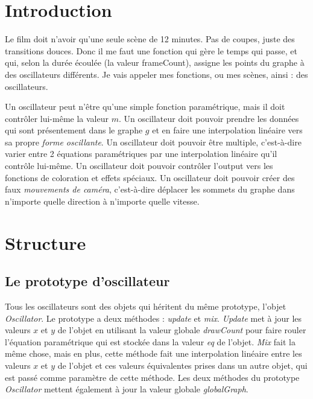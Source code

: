 
\section{Introduction}
Le film doit n'avoir qu'une seule scène de 12 minutes. Pas de coupes, juste des transitions douces. Donc il me faut une fonction qui gère le temps qui passe, et qui, selon la durée écoulée (la valeur frameCount), assigne les points du graphe à des oscillateurs différents. Je vais appeler mes fonctions, ou mes scènes, ainsi : des oscillateurs. 

Un oscillateur peut n'être qu'une simple fonction paramétrique, mais il doit contrôler lui-même la valeur $m$. Un oscillateur doit pouvoir prendre les données qui sont présentement dans le graphe $g$ et en faire une interpolation linéaire vers sa propre \textit{forme oscillante}. Un oscillateur doit pouvoir être multiple, c'est-à-dire varier entre 2 équations paramétriques par une interpolation linéaire qu'il contrôle lui-même. Un oscillateur doit pouvoir contrôler l'output vers les fonctions de coloration et effets spéciaux. Un oscillateur doit pouvoir créer des faux \textit{mouvements de caméra}, c'est-à-dire déplacer les sommets du graphe dans n'importe quelle direction à n'importe quelle vitesse.

\section{Structure}
\subsection{Le prototype d'oscillateur}
Tous les oscillateurs sont des objets qui héritent du même prototype, l'objet \textit{Oscillator}. Le prototype a deux méthodes : \textit{update} et \textit{mix}. \textit{Update} met à jour les valeurs $x$ et $y$ de l'objet en utilisant la valeur globale \textit{drawCount} pour faire rouler l'équation paramétrique qui est stockée dans la valeur \textit{eq} de l'objet. \textit{Mix} fait la même chose, mais en plus, cette méthode fait une interpolation linéaire entre les valeurs $x$ et $y$ de l'objet et ces valeurs équivalentes prises dans un autre objet, qui est passé comme paramètre de cette méthode. Les deux méthodes du prototype \textit{Oscillator} mettent également à jour la valeur globale \textit{globalGraph}.


